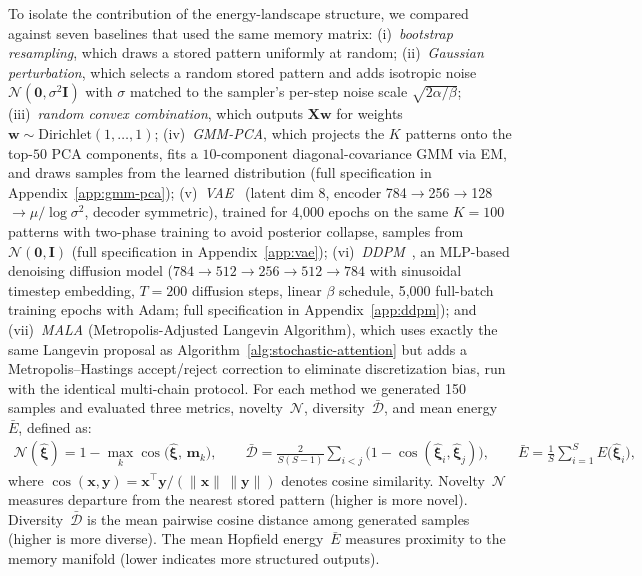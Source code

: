 To isolate the contribution of the energy-landscape structure, we compared against seven baselines that used the same memory matrix: (i)~\emph{bootstrap resampling}, which draws a stored pattern uniformly at random; (ii)~\emph{Gaussian perturbation}, which selects a random stored pattern and adds isotropic noise $\mathcal{N}(\mathbf{0},\sigma^{2}\mathbf{I})$ with $\sigma$ matched to the sampler's per-step noise scale $\sqrt{2\alpha/\beta}$; (iii)~\emph{random convex combination}, which outputs $\mathbf{X}\mathbf{w}$ for weights $\mathbf{w}\sim\mathrm{Dirichlet}(1,\dots,1)$; (iv)~\emph{GMM-PCA}, which projects the $K$ patterns onto the top-$50$ PCA components, fits a $10$-component diagonal-covariance GMM via EM, and draws samples from the learned distribution (full specification in Appendix~\ref{app:gmm-pca}); (v)~\emph{VAE}~\cite{kingmaWellingAutoEncoding2014} (latent dim 8, encoder 784$\to$256$\to$128$\to\mu/\log\sigma^2$, decoder symmetric), trained for 4{,}000 epochs on the same $K{=}100$ patterns with two-phase training to avoid posterior collapse, samples from $\mathcal{N}(\mathbf{0},\mathbf{I})$ (full specification in Appendix~\ref{app:vae}); (vi)~\emph{DDPM}~\cite{hoDenoisingDiffusionProbabilistic2020}, an MLP-based denoising diffusion model ($784\to512\to256\to512\to784$ with sinusoidal timestep embedding, $T{=}200$ diffusion steps, linear $\beta$ schedule, 5{,}000 full-batch training epochs with Adam; full specification in Appendix~\ref{app:ddpm}); and (vii)~\emph{MALA} (Metropolis-Adjusted Langevin Algorithm), which uses exactly the same Langevin proposal as Algorithm~\ref{alg:stochastic-attention} but adds a Metropolis--Hastings accept/reject correction to eliminate discretization bias, run with the identical multi-chain protocol.
For each method we generated 150 samples and evaluated three metrics, novelty~$\mathcal{N}$, diversity~$\bar{\mathcal{D}}$, and mean energy~$\bar{E}$, defined as:
\begin{align*}
\mathcal{N}(\hat{\boldsymbol{\xi}}) = 1 - \max_{k}\cos\!\bigl(\hat{\boldsymbol{\xi}},\,\mathbf{m}_{k}\bigr),\qquad
\bar{\mathcal{D}} = \frac{2}{S(S{-}1)}\!\sum_{i<j}\bigl(1-\cos(\hat{\boldsymbol{\xi}}_i,\hat{\boldsymbol{\xi}}_j)\bigr),\qquad
\bar{E} = \frac{1}{S}\sum_{i=1}^{S} E\!\bigl(\hat{\boldsymbol{\xi}}_i\bigr),
\end{align*}
where $\cos(\mathbf{x},\mathbf{y})=\mathbf{x}^{\top}\mathbf{y}/(\lVert\mathbf{x}\rVert\,\lVert\mathbf{y}\rVert)$ denotes cosine similarity.
Novelty~$\mathcal{N}$ measures departure from the nearest stored pattern (higher is more novel). Diversity~$\bar{\mathcal{D}}$ is the mean pairwise cosine distance among generated samples (higher is more diverse). The mean Hopfield energy~$\bar{E}$ measures proximity to the memory manifold (lower indicates more structured outputs).


